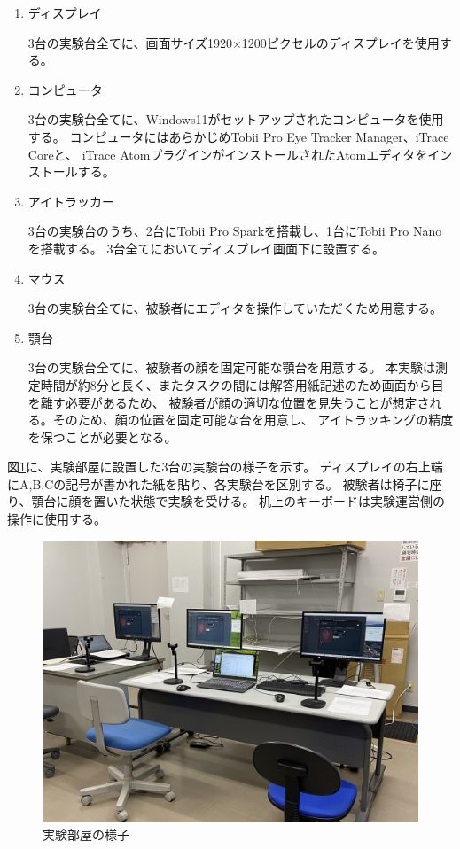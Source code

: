 \documentclass[paper=a4paper,fontsize=11pt]{jlreq}
\begin{document}
    \begin{enumerate}
      \item ディスプレイ 
      
      3台の実験台全てに、画面サイズ1920×1200ピクセルのディスプレイを使用する。
      
      \item コンピュータ
      
      3台の実験台全てに、Windows11がセットアップされたコンピュータを使用する。
      コンピュータにはあらかじめTobii Pro Eye Tracker Manager、iTrace Coreと、
      iTrace AtomプラグインがインストールされたAtomエディタをインストールする。
      
      \item アイトラッカー
      
      3台の実験台のうち、2台にTobii Pro Sparkを搭載し、1台にTobii Pro Nanoを搭載する。
      3台全てにおいてディスプレイ画面下に設置する。
      
      \item マウス
      
      3台の実験台全てに、被験者にエディタを操作していただくため用意する。
      
      \item 顎台
      
      3台の実験台全てに、被験者の顔を固定可能な顎台を用意する。
      本実験は測定時間が約8分と長く、またタスクの間には解答用紙記述のため画面から目を離す必要があるため、
      被験者が顔の適切な位置を見失うことが想定される。そのため、顔の位置を固定可能な台を用意し、
      アイトラッキングの精度を保つことが必要となる。
    \end{enumerate}

    図\ref{実験部屋}に、実験部屋に設置した3台の実験台の様子を示す。
    ディスプレイの右上端にA,B,Cの記号が書かれた紙を貼り、各実験台を区別する。
    被験者は椅子に座り、顎台に顔を置いた状態で実験を受ける。
    机上のキーボードは実験運営側の操作に使用する。
    
          
    \begin{figure}[htbp]
      \centering
      \includegraphics[width=0.8\linewidth]{実験部屋.jpg}
      \caption{実験部屋の様子}
      \label{実験部屋}
    \end{figure}
    \FloatBarrier  
  \clearpage
\end{document}
